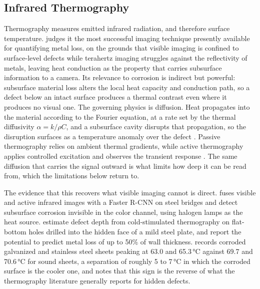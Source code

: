 \subsection{Infrared Thermography}

Thermography measures emitted infrared radiation, and therefore surface
temperature. \citet{Egodawela2025} judges it the most successful imaging
technique presently available for quantifying metal loss, on the grounds that
visible imaging is confined to surface-level defects while terahertz imaging
struggles against the reflectivity of metals, leaving heat conduction as the
property that carries subsurface information to a camera. Its relevance to corrosion is indirect but powerful: subsurface
material loss alters the local heat capacity and conduction path, so a defect
below an intact surface produces a thermal contrast even where it produces no
visual one. The governing physics is diffusion. Heat propagates into the
material according to the Fourier equation, at a rate set by the thermal
diffusivity $\alpha = k/\rho C$, and a subsurface cavity disrupts that
propagation, so the disruption surfaces as a temperature anomaly over the
defect \citep{Doshvarpassand2022}. Passive thermography relies on ambient
thermal gradients, while active thermography applies controlled excitation and
observes the transient response \citep{Elizalde2023}. The same diffusion that
carries the signal outward is what limits how deep it can be read from, which
the limitations below return to.

The evidence that this recovers what visible imaging cannot is direct.
\citet{Lim2021} fuses visible and active infrared images with a Faster R-CNN on
steel bridges and detect subsurface corrosion invisible in the color channel,
using halogen lamps as the heat source. \citet{Doshvarpassand2022} estimate defect depth from cold-stimulated
thermography on flat-bottom holes drilled into the hidden face of a mild steel
plate, and report the potential to predict metal loss of up to 50\% of wall
thickness. \citet{Elizalde2023} records corroded galvanized and stainless steel sheets
peaking at 63.0 and 65.3\,\si{\degreeCelsius} against 69.7 and
70.6\,\si{\degreeCelsius} for sound sheets, a separation of roughly 5 to
7\,\si{\degreeCelsius} in which the corroded surface is the cooler one, and
notes that this sign is the reverse of what the thermography literature
generally reports for hidden defects.


